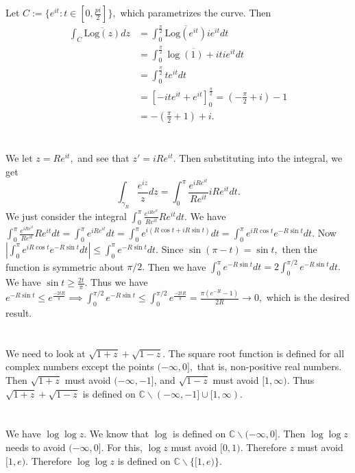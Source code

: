 \documentclass{article}
\begin{document}
\section{} %
Let $C:=\{e^{it}: t \in \left[0,\frac{pi}{2}\right]\},$ which parametrizes the curve. Then 
\begin{align*}
\int_C \overline{\text{Log}(z)} dz &= \int_{0}^{\frac{\pi}{2}}\overline{\text{Log}(e^{it})} ie^{it}dt\\
	&=\int_{0}^{\frac{\pi}{2}}\overline{\log(1)+it}ie^{it}dt\\
	&=\int_{0}^{\frac{\pi}{2}}te^{it} dt\\
	&= [-ite^{it}+e^{it}]^{\frac{\pi}{2}}_0= (-\frac{\pi}{2}+i)-1\\
	&= -\left(\frac{\pi}{2}+1\right)+i.
\end{align*}

\section{} %
We let $z=Re^{it},$ and see that $z'=iRe^{it}.$ Then substituting into the integral, we get 
$$\int_{\gamma_R} \frac{e^{iz}}{z}dz = \int_{0}^{\pi} \frac{e^{iRe^{it}}}{Re^{it}}iRe^{it}dt.$$ We just consider the integral $\int_{0}^{\pi} 
\frac{e^{iRe^{it}}}{Re^{it}}Re^{it}dt.$ We have $\int_{0}^{\pi} \frac{e^{iRe^{it}}}{Re^{it}}Re^{it}dt=\int_{0}^{\pi} e^{iRe^{it}}dt=\int_{0}^{\pi} 
e^{i(R\cos t + iR \sin t)}dt=\int_{0}^{\pi} e^{iR\cos t} e^{-R \sin t}dt.$ Now $\left|\int_{0}^{\pi} e^{iR\cos t} e^{-R \sin t}dt\right| \leq 
\int_{0}^{\pi}e^{-R \sin t}dt.$ Since $\sin (\pi -t) = \sin t,$ then the function is symmetric about $\pi/2.$ Then we have  $\int_{0}^{\pi}e^{-R \sin t}dt = 
2 \int_{0}^{\pi/2}e^{-R \sin t}dt.$ We have $\sin t \geq \frac{2t}{\pi}.$ Thus we have $ e^{-R \sin t} \leq e^{\frac{-2tR}{\pi}} \implies \int_{0}^{\pi/2} 
e^{-R \sin t} \leq \int_{0}^{\pi/2} e^{\frac{-2tR}{\pi}}= \frac{\pi (e^{-R}-1)}{2R} \to 0,$ which is the desired result.
\section{} %
We need to look at $ \sqrt{1+z} + \sqrt{1-z}.$ The square root function is defined for all complex numbers except the points $(-\infty,0],$ that is, 
non-positive real numbers. Then $\sqrt{1+z}$ must avoid $(-\infty, -1]$, and $\sqrt{1-z}$ must avoid $ [1,\infty).$ Thus $\sqrt{1+z} + \sqrt{1-z}$ is 
defined on $\mathbb{C}\backslash (-\infty, -1] \cup  [1,\infty).$
\section{} %
We have $\log \log z.$ We know that $\log $ is defined on $\mathbb{C} \backslash (-\infty, 0].$ Then $\log \log z $ needs to avoid $(-\infty,0].$ For this, 
$\log z$ must avoid $[0,1).$ Therefore $z$ must avoid $[1,e).$ Therefore $\log \log z$ is defined on $\mathbb{C} \backslash \{[1,e)\}.$ 
\end{document}
